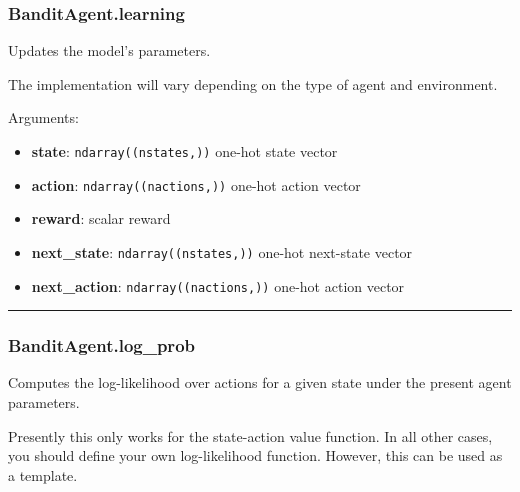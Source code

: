 \subsubsection{BanditAgent.learning}\label{banditagent.learning}

\begin{Shaded}
\begin{Highlighting}[]
\end{Highlighting}
\end{Shaded}

Updates the model's parameters.

The implementation will vary depending on the type of agent and
environment.

Arguments:

\begin{itemize}
\tightlist
\item
  \textbf{state}: \texttt{ndarray((nstates,))} one-hot state vector
\item
  \textbf{action}: \texttt{ndarray((nactions,))} one-hot action vector
\item
  \textbf{reward}: scalar reward
\item
  \textbf{next\_state}: \texttt{ndarray((nstates,))} one-hot next-state
  vector
\item
  \textbf{next\_action}: \texttt{ndarray((nactions,))} one-hot action
  vector
\end{itemize}

\begin{center}\rule{0.5\linewidth}{\linethickness}\end{center}

\subsubsection{BanditAgent.log\_prob}\label{banditagent.log_prob}

\begin{Shaded}
\begin{Highlighting}[]
\end{Highlighting}
\end{Shaded}

Computes the log-likelihood over actions for a given state under the
present agent parameters.

Presently this only works for the state-action value function. In all
other cases, you should define your own log-likelihood function.
However, this can be used as a template.

